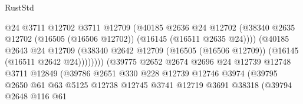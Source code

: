 \begin{lexlean}{RustStd}
\begin{coremodule}
                                          @24
                                          @3711
                                          @12702
                                          @3711
                                          @12709
                                          (@40185
                                            @2636
                                            @24
                                            @12702
                                            (@38340
                                              @2635
                                              @12702
                                              (@16505 (@16506 @12702))
                                              (@16145 (@16511 @2635 @24))))
                                          (@40185
                                            @2643
                                            @24
                                            @12709
                                            (@38340
                                              @2642
                                              @12709
                                              (@16505 (@16506 @12709))
                                              (@16145 (@16511 @2642 @24))))))))
                                  (@39775
                                    @2652
                                    @2674
                                    @2696
                                    @24
                                    @12739
                                    @12748
                                    @3711
                                    @12849
                                    (@39786
                                      @2651
                                      @330
                                      @228
                                      @12739
                                      @12746
                                      @3974
                                      (@39795
                                        @2650
                                        @61
                                        @63
                                        @5125
                                        @12738
                                        @12745
                                        @3741
                                        @12719
                                        @3691
                                        @38318
                                        (@39794
                                          @2648
                                          @116
                                          @61

\end{coremodule}
\end{lexlean}
